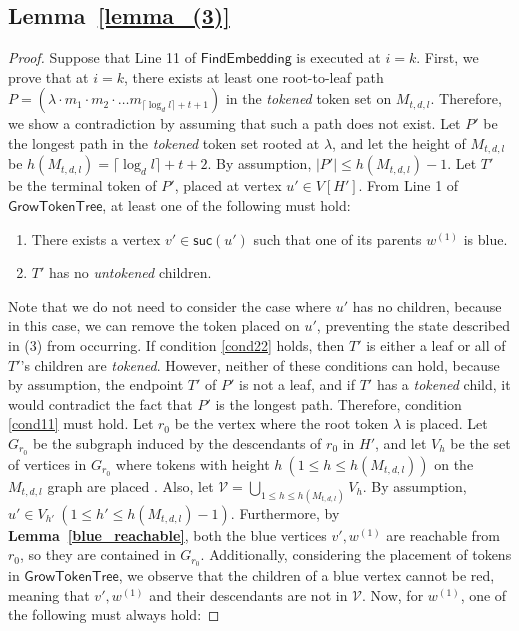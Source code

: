 \documentclass[runningheads]{llncs}
\theoremstyle{plain}
\theoremstyle{definition}
\begin{document}
\subsection{\textbf{Lemma~\ref{lemma_(3)}}}
\begin{proof}
    Suppose that Line 11 of $\mathsf{FindEmbedding}$ is executed at $i = k$. First, we prove that at $i = k$, there exists at least one root-to-leaf path $P = (\lambda \cdot m_1 \cdot m_2 \cdot \dots m_{\lceil \log_d l \rceil +t+1})$ in the \textit{tokened} token set on $M_{t, d, l}$. Therefore, we show a contradiction by assuming that such a path does not exist. Let $P'$ be the longest path in the \textit{tokened} token set rooted at $\lambda$, and let the height of $M_{t, d, l}$ be $h(M_{t, d, l}) = \lceil \log_d l \rceil +t+2$. By assumption, $|P'| \leq h(M_{t, d, l}) - 1$. Let $T'$ be the terminal token of $P'$, placed at vertex $u' \in V[H']$. From Line 1 of $\mathsf{GrowTokenTree}$, at least one of the following must hold:
    
    \begin{enumerate}
        \item There exists a vertex $v' \in \mathsf{suc}(u')$ such that one of its parents $w^{(1)}$ is blue. \label{cond11}
        \item $T'$ has no \textit{untokened} children. \label{cond22}
    \end{enumerate}
    
    Note that we do not need to consider the case where $u'$ has no children, because in this case, we can remove the token placed on $u'$, preventing the state described in (3) from occurring. If condition \ref{cond22} holds, then $T'$ is either a leaf or all of $T'$'s children are \textit{tokened}. However, neither of these conditions can hold, because by assumption, the endpoint $T'$ of $P'$ is not a leaf, and if $T'$ has a \textit{tokened} child, it would contradict the fact that $P'$ is the longest path. Therefore, condition \ref{cond11} must hold. Let $r_0$ be the vertex where the root token $\lambda$ is placed. Let $G_{r_0}$ be the subgraph induced by the descendants of $r_0$ in $H'$, and let $V_h$ be the set of vertices in $G_{r_0}$ where tokens with height $h\ (1 \leq h \leq h(M_{t, d, l}))$ on the $M_{t, d, l}$ graph are placed . Also, let $\mathcal{V} = \bigcup_{1 \leq h \leq h(M_{t, d, l})} V_h$. By assumption, $u' \in V_{h'}\ (1 \leq h' \leq h(M_{t, d, l})-1)$. Furthermore, by \textbf{Lemma~\ref{blue_reachable}}, both the blue vertices $v', w^{(1)}$ are reachable from $r_0$, so they are contained in $G_{r_0}$. Additionally, considering the placement of tokens in $\mathsf{GrowTokenTree}$, we observe that the children of a blue vertex cannot be red, meaning that $v', w^{(1)}$ and their descendants are not in $\mathcal{V}$. Now, for $w^{(1)}$, one of the following must always hold:


\end{proof}
\end{document}

